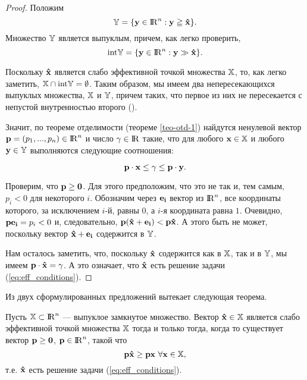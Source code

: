 \begin{proof}
Положим
\[
    \mathbb{Y}=\{\mathbf{y} \in {\rm I\!R}^n: \mathbf{y} \geqq \mathbf{\hat x}\}.
\]
Множество $\mathbb{Y}$ является выпуклым, причем, как легко проверить,
\[
    \text{int}\mathbb{Y}=\{\mathbf{y} \in {\rm I\!R}^n: \mathbf{y} \gg \mathbf{\hat x}\}.
\]

 Поскольку $\mathbf{\hat x}$
является слабо эффективной точкой множества $\mathbb{X}$, то, как легко заметить,
 $\mathbb{X}\cap\text{int}\mathbb{Y}=\emptyset$. Таким образом, мы имеем два непересекающихся
 выпуклых множества, $\mathbb{X}$ и $\mathbb{Y}$, причем таких, что первое из них не пересекается
 с непустой внутренностью второго ().

Значит, по теореме отделимости (теореме \ref{teo-otd-1}) найдутся
ненулевой вектор $\mathbf{p}=(p_{1},...,p_{n})\in {\rm I\!R}^n$ и число
    $\gamma\in {\rm I\!R}$ такие, что для любого $\mathbf{x} \in \mathbb{X}$ и любого $\mathbf{y}
\in \mathbb{Y}$ выполняются следующие соотношения:

\[
\mathbf{p} \cdot \mathbf{x} \leq \gamma \leq \mathbf{p} \cdot \mathbf{y}.
\]

    Проверим, что $\mathbf{p} \geq \mathbf{0}$. Для этого предположим, что
 это не так и, тем самым, $p_i <0$ для некоторого $i$. Обозначим
 через $\mathbf{e_{i}}$ вектор из ${\rm I\!R}^{n}$, все координаты
 которого, за исключением $i$-й, равны $0$, а $i$-я координата равна
 $1$. Очевидно, $\mathbf{p}\mathbf{e_{i}}=p_{i}<0$
    и, следовательно, $\mathbf{p}(\mathbf{\hat x}+\mathbf{e_{i}})<\mathbf{p}\mathbf{\hat x}$.
    А этого быть не может, поскольку вектор $\mathbf{\hat x}+\mathbf{e_{i}}$ содержится в $\mathbb{Y}$.

    Нам осталось заметить, что, поскольку $\mathbf{\hat x}$ содержится как в $\mathbb{X}$, так и в
    $\mathbb{Y}$, мы имеем
    $\mathbf{p} \cdot \mathbf{\hat x}=\gamma$.
    А это означает, что
    $\mathbf{\hat x}$ есть решение задачи (\ref{eq:eff_conditions}).
\end{proof}

    Из двух сформулированных предложений вытекает следующая теорема.

\begin{teop}\label{neob-dosti-usl-eff}
    Пусть $\mathbb{X} \subset {\rm I\!R}^n$ --- выпуклое замкнутое множество.
    Вектор ${\mathbf{\hat x} \in \mathbb{X}}$ является слабо эффективной точкой
    множества $\mathbb{X}$ тогда и только тогда, когда то существует вектор
    ${\mathbf{p} \geq \mathbf{0}}$, $\mathbf{p} \in {\rm I\!R}^n$, такой что
    \[\mathbf{p}\mathbf{\hat x}\geq\mathbf{p}\mathbf{x} \ \forall \mathbf{x}\in\mathbb{X},\]
    т.е. $\mathbf{\hat x}$ есть решение задачи (\ref{eq:eff_conditions}).
\end{teop}



